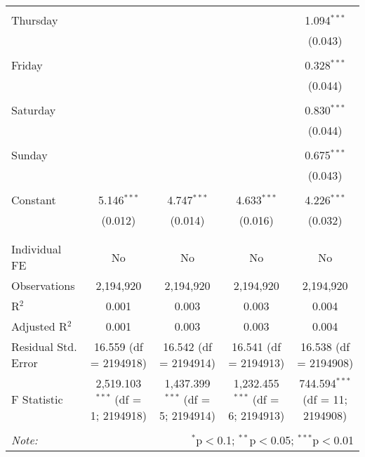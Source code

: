 \documentclass[
]{article}
\begin{document}
\begin{table}[!htbp]
{\begin{tabular}{@{\extracolsep{5pt}}lcccc}
  & & & & \\ 
 Thursday &  &  &  & 1.094$^{***}$ \\ 
  &  &  &  & (0.043) \\ 
  & & & & \\ 
 Friday &  &  &  & 0.328$^{***}$ \\ 
  &  &  &  & (0.044) \\ 
  & & & & \\ 
 Saturday &  &  &  & 0.830$^{***}$ \\ 
  &  &  &  & (0.044) \\ 
  & & & & \\ 
 Sunday &  &  &  & 0.675$^{***}$ \\ 
  &  &  &  & (0.043) \\ 
  & & & & \\ 
 Constant & 5.146$^{***}$ & 4.747$^{***}$ & 4.633$^{***}$ & 4.226$^{***}$ \\ 
  & (0.012) & (0.014) & (0.016) & (0.032) \\ 
  & & & & \\ 
\hline \\[-1.8ex] 
Individual FE & No & No & No & No \\ 
Observations & 2,194,920 & 2,194,920 & 2,194,920 & 2,194,920 \\ 
R$^{2}$ & 0.001 & 0.003 & 0.003 & 0.004 \\ 
Adjusted R$^{2}$ & 0.001 & 0.003 & 0.003 & 0.004 \\ 
Residual Std. Error & 16.559 (df = 2194918) & 16.542 (df = 2194914) & 16.541 (df = 2194913) & 16.538 (df = 2194908) \\ 
F Statistic & 2,519.103$^{***}$ (df = 1; 2194918) & 1,437.399$^{***}$ (df = 5; 2194914) & 1,232.455$^{***}$ (df = 6; 2194913) & 744.594$^{***}$ (df = 11; 2194908) \\ 
\hline 
\hline \\[-1.8ex] 
\textit{Note:}  & \multicolumn{4}{r}{$^{*}$p$<$0.1; $^{**}$p$<$0.05; $^{***}$p$<$0.01} \\ 
\end{tabular}
} 
\end{table} 
\newpage
\end{document}
